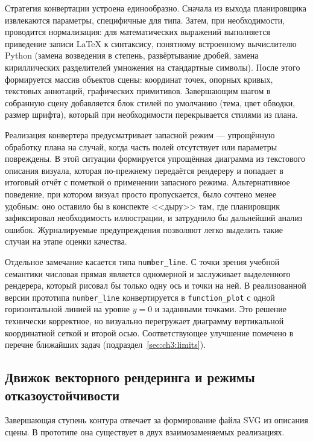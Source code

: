 Стратегия конвертации устроена единообразно. Сначала из выхода планировщика извлекаются параметры, специфичные для типа. Затем, при необходимости, проводится нормализация: для математических выражений выполняется приведение записи LaTeX к синтаксису, понятному встроенному вычислителю Python (замена возведения в степень, развёртывание дробей, замена кириллических разделителей умножения на стандартные символы). После этого формируется массив объектов сцены: координат точек, опорных кривых, текстовых аннотаций, графических примитивов. Завершающим шагом в собранную сцену добавляется блок стилей по умолчанию (тема, цвет обводки, размер шрифта), который при необходимости перекрывается стилями из плана.

Реализация конвертера предусматривает запасной режим --- упрощённую обработку плана на случай, когда часть полей отсутствует или параметры повреждены. В этой ситуации формируется упрощённая диаграмма из текстового описания визуала, которая по\nobreakdash-прежнему передаётся рендереру и попадает в итоговый отчёт с пометкой о применении запасного режима. Альтернативное поведение, при котором визуал просто пропускается, было сочтено менее удобным: оно оставило бы в конспекте <<дыру>> там, где планировщик зафиксировал необходимость иллюстрации, и затруднило бы дальнейший анализ ошибок. Журналируемые предупреждения позволяют легко выделить такие случаи на этапе оценки качества.

Отдельное замечание касается типа \texttt{number\_line}. С точки зрения учебной семантики числовая прямая является одномерной и заслуживает выделенного рендерера, который рисовал бы только одну ось и точки на ней. В реализованной версии прототипа \texttt{number\_line} конвертируется в \texttt{function\_plot} с одной горизонтальной линией на уровне \(y=0\) и заданными точками. Это решение технически корректное, но визуально перегружает диаграмму вертикальной координатной сеткой и второй осью. Соответствующее улучшение помечено в перечне ближайших задач (подраздел~\ref{sec:ch3:limits}).

\subsection{Движок векторного рендеринга и режимы отказоустойчивости}
\label{sec:ch3:renderer}

Завершающая ступень контура отвечает за формирование файла SVG из описания сцены. В прототипе она существует в двух взаимозаменяемых реализациях.

